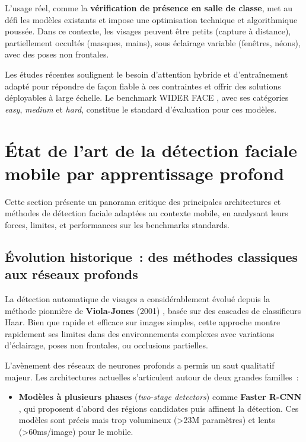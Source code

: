 \begin{onehalfspace}
\hspace{0.65 cm}L'usage réel, comme la \textbf{vérification de présence en salle de classe}, met au défi les modèles existants et impose une optimisation technique et algorithmique poussée. Dans ce contexte, les visages peuvent être petits (capture à distance), partiellement occultés (masques, mains), sous éclairage variable (fenêtres, néons), avec des poses non frontales.

\hspace{0.65 cm}Les études récentes \cite{Zhang2019BlazeFace, Kim2025FeatherFace, Wang2024ECACBAM} soulignent le besoin d'attention hybride et d'entraînement adapté pour répondre de façon fiable à ces contraintes et offrir des solutions déployables à large échelle. Le benchmark WIDER FACE \cite{Yang2016WIDERFACE}, avec ses catégories \textit{easy}, \textit{medium} et \textit{hard}, constitue le standard d'évaluation pour ces modèles.

\section{État de l'art de la détection faciale mobile par apprentissage profond}

\hspace{0.65 cm}Cette section présente un panorama critique des principales architectures et méthodes de détection faciale adaptées au contexte mobile, en analysant leurs forces, limites, et performances sur les benchmarks standards.

\subsection{Évolution historique~: des méthodes classiques aux réseaux profonds}

\hspace{0.65 cm}La détection automatique de visages a considérablement évolué depuis la méthode pionnière de \textbf{Viola-Jones} (2001) \cite{ViolaJones2001}, basée sur des cascades de classifieurs Haar. Bien que rapide et efficace sur images simples, cette approche montre rapidement ses limites dans des environnements complexes avec variations d'éclairage, poses non frontales, ou occlusions partielles.

\hspace{0.65 cm}L'avènement des réseaux de neurones profonds a permis un saut qualitatif majeur. Les architectures actuelles s'articulent autour de deux grandes familles~:

\begin{itemize}
\item \textbf{Modèles à plusieurs phases} (\textit{two-stage detectors}) comme \textbf{Faster R-CNN} \cite{Ren2015FasterRCNN}, qui proposent d'abord des régions candidates puis affinent la détection. Ces modèles sont précis mais trop volumineux (>23M paramètres) et lents (>60ms/image) pour le mobile.


\end{itemize}
\end{onehalfspace}
